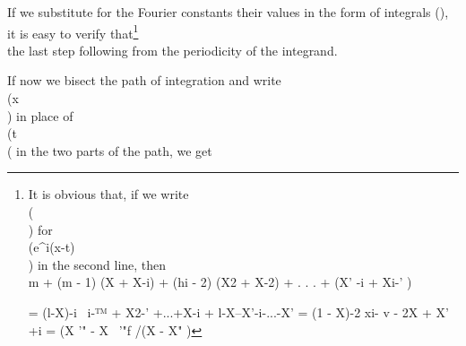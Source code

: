If we substitute for the Fourier constants their values in the form of
integrals (), it is easy to verify
that\footnote{It is obvious that, if we write \\(\lambda\\) for \\(e^{i(x-t)}\\) in the second line,
  then
  \\[ \begin{align*}
    m + &
    (m-1) (\lambda + \lambda^{-1})
    + (m-2) (\lambda^{2} + \lambda^{-2})
    + \cdots
    + (\lambda^{m-1} + \lambda^{1 - m})
    \\
    =&
    (1 - \lambda)^{-1} \left\{
      \lambda^{1-m}
      + \lambda^{2-m}
      + \cdots
      + \lambda^{-1}
      + 1
      - \lambda
      - \lambda^{2}
      - \cdots
      - \lambda^{m}
    \right\} \\
    =&
    (1 - \lambda)^{-2} \left\{
      \lambda^{1 - m}
      - 2 \lambda
      + \lambda^{m+1}
    \right\}
    =
    (\lambda^{\frac{1}{2} m} - \lambda^{-\frac{1}{2} m})^{2}
    /
    (\lambda^{\frac{1}{2}} - \lambda^{-\frac{1}{2}})^{2}.
  \end{align*} \\]
  m + (m - 1) (X + X-i) + (hi - 2) (X2 + X-2) + . . . + (X' -i + Xi-' )

  = (l-X)-i \ i-™ + X2-' +...+X-i + l-X--X'-i-...-X' = (1 - X)-2 xi- v -
  2X + X' +i = (X '" - X~ '"f /(X - X" )
}
\\[ \begin{align*}
  A_{0} + \sum_{n=1}^{m-1} S_{n}(x)
  =&
  m A_{0}
  + (m - 1) A_{1}(x)
  + (m - 2) A_{2}(x)
  + \cdots
  + A_{m-1}(x)
  \\
  =&
  \frac{1}{\pi}
  \! \int_{-\pi}^{\pi}\! \left\{
    \frac{1}{2} m
    + (m-1) \cos (x-t)
    + (m-2) \cos 2(x-t)
    + \cdots
    + \cos (m-1)(x-t)
  \right\}
  f(t) \, d t
  \\
  =&
  \frac{1}{2\pi}
  \! \int_{-\pi}^{\pi}\!
  \frac{\sin^{2} \frac{1}{2} m (x-t)}{\sin^{2} \frac{1}{2} (x-t)}
  f(t) \, d t
  \\
  =&
  \frac{1}{2\pi}
  \! \int_{-\pi+x}^{\pi+x}\!
  \frac{\sin^{2} \frac{1}{2} m (x-t)}{\sin^{2} \frac{1}{2} (x-t)}
  f(t) \, d t,
\end{align*} \\]
the last step following from the periodicity
of the integrand.

If now we bisect the path of integration and write \\(x \theta\\) in place of
\\(t\\( in the two parts of the path, we get
\\[ 
A_{0}
+ \sum_{n=1}^{m-1} S_{n}(x)
=
\frac{1}{\pi}
\! \int_{0}^{\frac{1}{2} \pi}\!
\frac{\sin^{2} m \theta}{\sin^{2} \theta}
f(x + 2\theta) \, d \theta
+
\frac{1}{\pi}
\! \int_{0}^{\frac{1}{2} \pi}\!
\frac{\sin^{2} m \theta}{\sin^{2} \theta}
f(x - 2\theta) \, d \theta
\\] 

